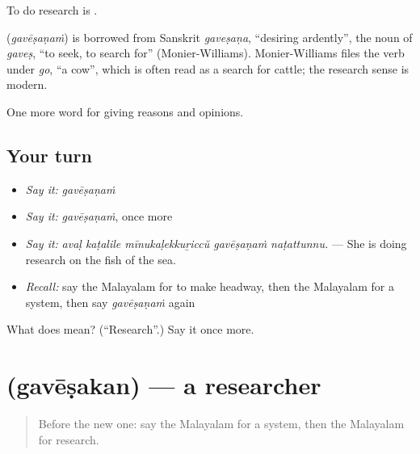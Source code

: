 To do research is  .

\begin{cousinweb}
\textbf{} (\emph{gavēṣaṇaṁ}) is borrowed from Sanskrit \emph{gaveṣaṇa}, \textquotedblleft{}desiring ardently\textquotedblright{}, the noun of \emph{gaveṣ}, \textquotedblleft{}to seek, to search for\textquotedblright{} (Monier-Williams). Monier-Williams files the verb under \emph{go}, \textquotedblleft{}a cow\textquotedblright{}, which is often read as a search for cattle; the research sense is modern.
\end{cousinweb}

\begin{grammarlens}[title={What you've built}]
One more word for giving reasons and opinions.
\end{grammarlens}

\subsection*{Your turn}
\begin{itemize}
\raggedright
  \item \emph{Say it:} \emph{gavēṣaṇaṁ}
  \item \emph{Say it:} \emph{gavēṣaṇaṁ}, once more
  \item \emph{Say it:} \emph{avaḷ kaṭalile mīnukaḷekkuṟiccŭ gavēṣaṇaṁ naṭattunnu.} — She is doing research on the fish of the sea.
  \item \emph{Recall:} say the Malayalam for to make headway, then the Malayalam for a system, then say \emph{gavēṣaṇaṁ} again
\end{itemize}

\begin{tcolorbox}[breakable,colback=teal!4,colframe=teal!35!black,title={Before you move on}]
What does  mean? (\textquotedblleft{}Research\textquotedblright{}.) Say it once more.
\end{tcolorbox}
\section[\texorpdfstring{\ml{ഗവേഷകൻ} (gavēṣakan)}{ഗവേഷകൻ (gavēṣakan)}]{ (gavēṣakan) — a researcher}

\label{lesson:ML-C432-gavesakan}



\begin{quote}
Before the new one: say the Malayalam for a system, then the Malayalam for research.
\end{quote}

